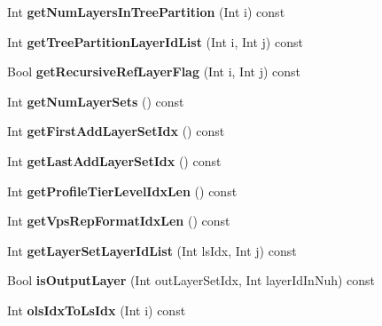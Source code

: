 \begin{DoxyCompactItemize}
Int {\bfseries get\+Num\+Layers\+In\+Tree\+Partition} (Int i) const
\item 
\mbox{\label{class_t_com_v_p_s_a02be2cba1a2f92f04143c5df3c3a0802}} 
Int {\bfseries get\+Tree\+Partition\+Layer\+Id\+List} (Int i, Int j) const
\item 
\mbox{\label{class_t_com_v_p_s_ac315187ab5411d39d8b64e6221aa7f53}} 
Bool {\bfseries get\+Recursive\+Ref\+Layer\+Flag} (Int i, Int j) const
\item 
\mbox{\label{class_t_com_v_p_s_ad1aceb89a4793ad65e4437ac9547fb04}} 
Int {\bfseries get\+Num\+Layer\+Sets} () const
\item 
\mbox{\label{class_t_com_v_p_s_a3a5088701030ff504a39d70faa56e0fc}} 
Int {\bfseries get\+First\+Add\+Layer\+Set\+Idx} () const
\item 
\mbox{\label{class_t_com_v_p_s_ac89dcd2bed82a11e6d9703161b65eaa8}} 
Int {\bfseries get\+Last\+Add\+Layer\+Set\+Idx} () const
\item 
\mbox{\label{class_t_com_v_p_s_afdc04346130a2002fb07bdb6a2af9106}} 
Int {\bfseries get\+Profile\+Tier\+Level\+Idx\+Len} () const
\item 
\mbox{\label{class_t_com_v_p_s_afa28963acf2081e762e870cd5c43bd5b}} 
Int {\bfseries get\+Vps\+Rep\+Format\+Idx\+Len} () const
\item 
\mbox{\label{class_t_com_v_p_s_a8042fc1e5c0ba3bed0ca8cf5f8a72b11}} 
Int {\bfseries get\+Layer\+Set\+Layer\+Id\+List} (Int ls\+Idx, Int j) const
\item 
\mbox{\label{class_t_com_v_p_s_a9b8a373ee73c58c4dc4d2d06151005c2}} 
Bool {\bfseries is\+Output\+Layer} (Int out\+Layer\+Set\+Idx, Int layer\+Id\+In\+Nuh) const
\item 
\mbox{\label{class_t_com_v_p_s_a3f08052f0a5fb8780e62407d2b2d5941}} 
Int {\bfseries ols\+Idx\+To\+Ls\+Idx} (Int i) const
\item 
\mbox{\label{class_t_com_v_p_s_af1a81de2cfb0b85388cb6662a63b8eef}} 

\end{DoxyCompactItemize}
